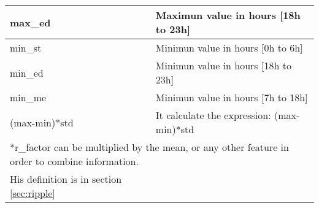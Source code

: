 \begin{table}[htbp]
\begin{tabular}{lr}
    \hline
    \multicolumn{1}{|l|}{max\_ed} & \multicolumn{1}{l|}{Maximun value in hours [18h to 23h]} \bigstrut\\
    \hline
    \multicolumn{1}{|l|}{min\_st} & \multicolumn{1}{l|}{Minimun value in hours [0h to 6h]} \bigstrut\\
    \hline
    \multicolumn{1}{|l|}{min\_ed} & \multicolumn{1}{l|}{Minimun value in hours [18h to 23h]} \bigstrut\\
    \hline
    \multicolumn{1}{|l|}{min\_me} & \multicolumn{1}{l|}{Minimun value in hours [7h to 18h]} \bigstrut\\
    \hline
    \multicolumn{1}{|l|}{(max-min)*std} & \multicolumn{1}{l|}{It calculate the expression: (max-min)*std} \bigstrut\\
    \hline
    \multicolumn{2}{l}{*r\_factor can be multiplied by the mean, or any other feature in order to combine information.} \bigstrut[t]\\
    His definition is in section \ref{sec:ripple} &  \\
    \end{tabular}%
  \label{tab:feature_list}%
\end{table}%




